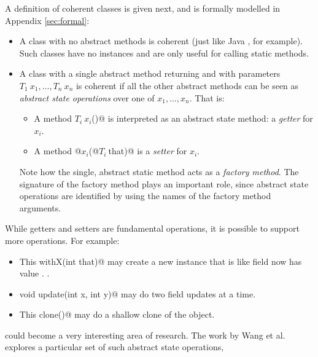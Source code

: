 \noindent A definition of coherent
classes is given next, and is formally modelled in Appendix \ref{sec:formal}:
\begin{itemize}
\item A class with no abstract methods is coherent (just like Java
  \Q@Math@, for example). Such classes have no instances and are only useful for calling static methods.
\item A class with a single abstract \Q@static@ method 
returning \Q@This@ and with parameters $T_1\ x_1, \ldots, T_n\ x_n$
is coherent if all the other abstract methods can be seen as \emph{abstract state
operations} over one of $x_1, \ldots, x_n$.
That is:
\begin{itemize}
\item A method $T_i\ x_i$\Q@()@ is interpreted as an abstract state method: a \emph{getter} for $x_i$.
\item A method \Q@void @$x_i$\Q@(@$T_i\ $\Q@ that)@ is a \emph{setter} for $x_i$.
\end{itemize}

Note how the single, abstract static
method acts as a \emph{factory method}.
The signature of the factory method plays an important role, since
abstract state operations are identified by using the names of the
factory method arguments.
\end{itemize}
\noindent
While getters and setters are fundamental operations, it is possible to
support more operations. For example:
\begin{itemize}
\item \Q@method This withX(int that)@
may create a new instance that is like \Q@this@ {} field \Q@x@ now has value \Q@that@.
.
\item \Q@method void update(int x, int y)@
may do two field updates at a time.
\item\Q@method This clone()@ may do a shallow clone of the object.
\end{itemize}

could become a very interesting area of research.
The work by Wang et al.~\cite{wang2016classless} explores a particular
set of such abstract state operations,

